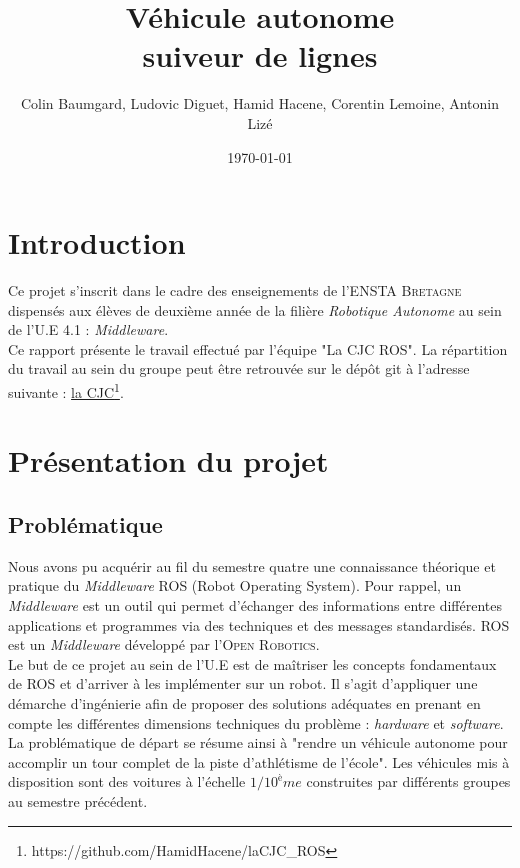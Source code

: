 \documentclass[12pt, openany]{report}
\title{Véhicule autonome \\ suiveur de lignes}
\author{Colin Baumgard, Ludovic Diguet, Hamid Hacene, Corentin Lemoine, Antonin Lizé}
\date{\today}
\begin{document}
\maketitle
\tableofcontents
\pagebreak

\section*{Introduction} 
Ce projet s'inscrit dans le cadre des enseignements de l'\textsc{ENSTA Bretagne} dispensés aux élèves de deuxième année de la filière \textit{Robotique Autonome} au sein de l'U.E 4.1 : \textit{Middleware}.\\

Ce rapport présente le travail effectué par l’équipe "La CJC ROS". La répartition du travail au sein du groupe peut être retrouvée sur le dépôt git à l’adresse suivante : \href{https://github.com/HamidHacene/laCJC_ROS}{la CJC}\footnote{https://github.com/HamidHacene/laCJC\_ROS}.\\

\section{Présentation du projet}
\subsection{Problématique}
Nous avons pu acquérir au fil du semestre quatre une connaissance théorique et pratique du \textit{Middleware} \textsc{ROS} (Robot Operating System). Pour rappel, un \textit{Middleware} est un outil qui permet d'échanger des informations entre différentes applications et programmes via des techniques et des messages standardisés. \textsc{ROS} est un \textit{Middleware} développé par l'\textsc{Open Robotics}.\\

Le but de ce projet au sein de l'U.E est de maîtriser les concepts fondamentaux de \textsc{ROS} et d'arriver à les implémenter sur un robot. Il s'agit d'appliquer une démarche d'ingénierie afin de proposer des solutions adéquates en prenant en compte les différentes dimensions techniques du problème : \textit{hardware} et \textit{software}.\\

La problématique de départ se résume ainsi à "rendre un véhicule autonome pour accomplir un tour complet de la piste d'athlétisme de l'école". Les véhicules mis à disposition sont des voitures à l'échelle $1/10^ème$ construites par différents groupes au semestre précédent.
\end{document}
